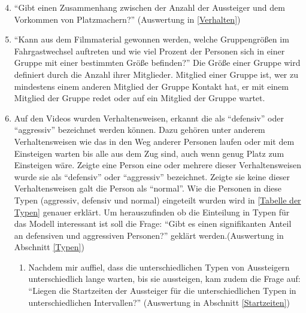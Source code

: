 \begin{enumerate}
\setcounter{enumi}{3}
	\item "`Gibt einen Zusammenhang zwischen der Anzahl der Aussteiger und dem Vorkommen von Platzmachern?"' (Auswertung in \ref{Verhalten})  \label{item:Platzmacher}
	\item "`Kann aus dem Filmmaterial gewonnen werden, welche Gruppengrößen im Fahrgastwechsel auftreten und wie viel Prozent der Personen sich in einer Gruppe mit einer bestimmten Größe befinden?"' Die Größe einer Gruppe wird definiert durch die Anzahl ihrer Mitglieder. Mitglied einer Gruppe ist, wer zu mindestens einem anderen Mitglied der Gruppe Kontakt hat, \dahe er mit einem Mitglied der Gruppe redet oder auf ein Mitglied der Gruppe wartet. \label{item:Goupsize} 
	\item Auf den Videos wurden Verhaltensweisen, erkannt die als "`defensiv"' oder "`aggressiv"' bezeichnet werden können. Dazu gehören unter anderem Verhaltensweisen wie das in den Weg anderer Personen laufen oder mit dem Einsteigen warten bis alle aus dem Zug sind, auch wenn genug Platz zum Einsteigen wäre. Zeigte eine Person eine oder mehrere dieser Verhaltensweisen wurde sie als "`defensiv"' oder "`aggressiv"' bezeichnet. Zeigte sie keine dieser Verhaltensweisen galt die Person als "`normal"'. Wie die Personen in diese Typen (aggressiv, defensiv und normal) eingeteilt wurden wird in \ref{Tabelle der Typen} genauer erklärt. Um herauszufinden ob die Einteilung in Typen für das Modell interessant ist soll die Frage: "`Gibt es einen signifikanten Anteil an defensiven und aggressiven Personen?"' geklärt werden.(Auswertung in Abschnitt \ref{Typen}) \label{item:Typen,Typen}
	\begin{enumerate}
		\item Nachdem mir auffiel, dass die unterschiedlichen Typen von Aussteigern unterschiedlich lange warten, bis sie aussteigen, kam zudem die Frage auf: "`Liegen die Startzeiten der Aussteiger für die unterschiedlichen Typen in unterschiedlichen Intervallen?"' (Auswertung in Abschnitt \ref{Startzeiten}) \label{item:Typen,Startzeiten}
	\end{enumerate} 
\end{enumerate}
